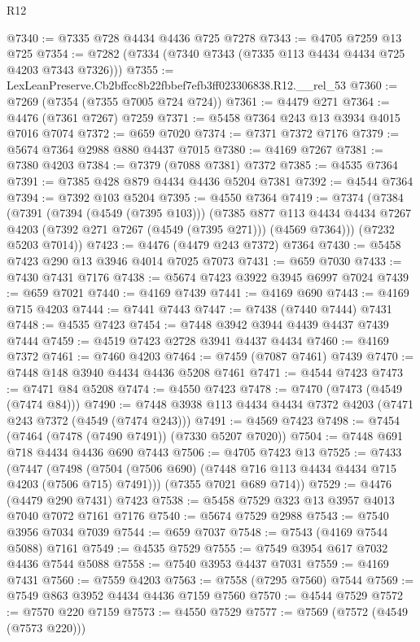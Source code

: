 \begin{lexlean}{R12}
\begin{coremodule}
@7340 := @7335 @728 @4434 @4436 @725 @7278
@7343 := @4705 @7259 @13 @725
@7354 := @7282 (@7334 (@7340 @7343 (@7335 @113 @4434 @4434 @725 @4203 @7343 @7326)))
@7355 := LexLeanPreserve.Cb2bffcc8b22fbbef7efb3ff023306838.R12.__rel_53
@7360 := @7269 (@7354 (@7355 @7005 @724 @724))
@7361 := @4479 @271
@7364 := @4476 (@7361 @7267) @7259
@7371 := @5458 @7364 @243 @13 @3934 @4015 @7016 @7074
@7372 := @659 @7020
@7374 := @7371 @7372 @7176
@7379 := @5674 @7364 @2988 @880 @4437 @7015
@7380 := @4169 @7267
@7381 := @7380 @4203
@7384 := @7379 (@7088 @7381) @7372
@7385 := @4535 @7364
@7391 := @7385 @428 @879 @4434 @4436 @5204 @7381
@7392 := @4544 @7364
@7394 := @7392 @103 @5204
@7395 := @4550 @7364
@7419 := @7374
    (@7384
      (@7391
        (@7394 (@4549 (@7395 @103)))
        (@7385
          @877
          @113
          @4434
          @4434
          @7267
          @4203
          (@7392 @271 @7267 (@4549 (@7395 @271)))
          (@4569 @7364)))
      (@7232 @5203 @7014))
@7423 := @4476 (@4479 @243 @7372) @7364
@7430 := @5458 @7423 @290 @13 @3946 @4014 @7025 @7073
@7431 := @659 @7030
@7433 := @7430 @7431 @7176
@7438 := @5674 @7423 @3922 @3945 @6997 @7024
@7439 := @659 @7021
@7440 := @4169 @7439
@7441 := @4169 @690
@7443 := @4169 @715 @4203
@7444 := @7441 @7443
@7447 := @7438 (@7440 @7444) @7431
@7448 := @4535 @7423
@7454 := @7448 @3942 @3944 @4439 @4437 @7439 @7444
@7459 := @4519 @7423 @2728 @3941 @4437 @4434
@7460 := @4169 @7372
@7461 := @7460 @4203
@7464 := @7459 (@7087 @7461) @7439
@7470 := @7448 @148 @3940 @4434 @4436 @5208 @7461
@7471 := @4544 @7423
@7473 := @7471 @84 @5208
@7474 := @4550 @7423
@7478 := @7470 (@7473 (@4549 (@7474 @84)))
@7490 := @7448 @3938 @113 @4434 @4434 @7372 @4203 (@7471 @243 @7372 (@4549 (@7474 @243)))
@7491 := @4569 @7423
@7498 := @7454 (@7464 (@7478 (@7490 @7491)) (@7330 @5207 @7020))
@7504 := @7448 @691 @718 @4434 @4436 @690 @7443
@7506 := @4705 @7423 @13
@7525 := @7433
    (@7447
      (@7498 (@7504 (@7506 @690) (@7448 @716 @113 @4434 @4434 @715 @4203 (@7506 @715) @7491)))
      (@7355 @7021 @689 @714))
@7529 := @4476 (@4479 @290 @7431) @7423
@7538 := @5458 @7529 @323 @13 @3957 @4013 @7040 @7072 @7161 @7176
@7540 := @5674 @7529 @2988
@7543 := @7540 @3956 @7034 @7039
@7544 := @659 @7037
@7548 := @7543 (@4169 @7544 @5088) @7161
@7549 := @4535 @7529
@7555 := @7549 @3954 @617 @7032 @4436 @7544 @5088
@7558 := @7540 @3953 @4437 @7031
@7559 := @4169 @7431
@7560 := @7559 @4203
@7563 := @7558 (@7295 @7560) @7544
@7569 := @7549 @863 @3952 @4434 @4436 @7159 @7560
@7570 := @4544 @7529
@7572 := @7570 @220 @7159
@7573 := @4550 @7529
@7577 := @7569 (@7572 (@4549 (@7573 @220)))

\end{coremodule}
\end{lexlean}
